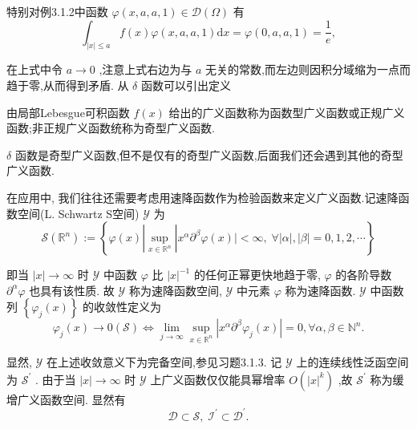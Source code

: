 \documentclass[lang=cn,newtx,10pt,scheme=chinese,thmcnt=chapter]{elegantbook}
\newcommand{\dif}{\mathrm{d}}
\begin{document}
特别对例3.1.2中函数 \(\varphi \left( {x,a,a,1}\right)  \in  \mathcal{D}\left( \Omega \right)\) 有
\begin{equation*}
{\int }_{\left| x\right|  \leqslant  a}f\left( x\right) \varphi \left( {x,a,a,1}\right) {\dif x} = \varphi \left( {0,a,a,1}\right)  = \frac{1}{e},
\end{equation*}

在上式中令 \(a \rightarrow  0\) ,注意上式右边为与 \(a\) 无关的常数,而左边则因积分域缩为一点而趋于零,从而得到矛盾. 从 \(\delta\) 函数可以引出定义
\begin{definition}
  由局部Lebesgue可积函数 \(f\left( x\right)\) 给出的广义函数称为函数型广义函数或正规广义函数;非正规广义函数统称为奇型广义函数.

\end{definition}
\begin{note}
\(\delta\) 函数是奇型广义函数,但不是仅有的奇型广义函数,后面我们还会遇到其他的奇型广义函数.
\end{note}

在应用中, 我们往往还需要考虑用速降函数作为检验函数来定义广义函数.记速降函数空间(L. Schwartz S空间) \(\mathcal{Y}\) 为
\begin{equation}
\mathcal{S}\left( {\mathbb{R}}^{n}\right)  \mathrel{\text{ := }} \left\{  {\varphi \left( x\right) \left| \mathop{\sup }\limits_{{x \in  {\mathbb{R}}^{n}}}\right| {x}^{\alpha }{\partial }^{\beta }\varphi \left( x\right)  \mid   < \infty ,\;\forall \left| \alpha \right| ,\left| \beta \right|  = 0,1,2,\cdots }\right\}   \label{3.6}
\end{equation}

即当 \(\left| x\right|  \rightarrow  \infty\) 时 \(\mathcal{Y}\) 中函数 \(\varphi\) 比 \({\left| x\right| }^{-1}\) 的任何正幂更快地趋于零, \(\varphi\) 的各阶导数 \({\partial }^{\alpha }\varphi\) 也具有该性质. 故 \(\mathcal{Y}\) 称为速降函数空间, \(\mathcal{Y}\) 中元素 \(\varphi\) 称为速降函数. \(\mathcal{Y}\) 中函数列 \(\left\{  {{\varphi }_{j}\left( x\right) }\right\}\) 的收敛性定义为
\begin{equation*}
{\varphi }_{j}\left( x\right)  \rightarrow  0\left( \mathcal{S}\right)  \Leftrightarrow  \mathop{\lim }\limits_{{j \rightarrow  \infty }}\mathop{\sup }\limits_{{x \in  {\mathbb{R}}^{n}}}\left| {{x}^{\alpha }{\partial }^{\beta }{\varphi }_{j}\left( x\right) }\right|  = 0,\forall \alpha ,\beta  \in  {\mathbb{N}}^{n}.
\end{equation*}

显然, \(\mathcal{Y}\) 在上述收敛意义下为完备空间,参见习题3.1.3. 记 \(\mathcal{Y}\) 上的连续线性泛函空间为 \({\mathcal{S}}^{\prime }\) . 由于当 \(\left| x\right|  \rightarrow  \infty\) 时 \(\mathcal{Y}\) 上广义函数仅仅能具幂增率 \(O\left( {\left| x\right| }^{k}\right)\) ,故 \({\mathcal{S}}^{\prime }\) 称为缓增广义函数空间. 显然有
\begin{equation*}
\mathcal{D} \subset  \mathcal{S},\;{\mathcal{I}}^{\prime } \subset  {\mathcal{D}}^{\prime }.
\end{equation*}
\end{document}
